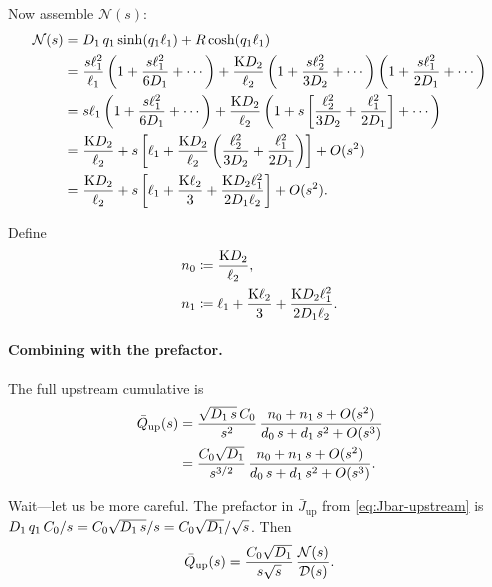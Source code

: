 Now assemble $\mathcal{N}(s)$:
\begin{align}
  \mathcal{N}(s)
  &= D_{1}\,q_1\sinh(q_1\ell_{1}) + R\cosh(q_1\ell_{1})
  \notag\\
  &= \frac{s\ell_{1}^2}{\ell_{1}}
  \left(1 + \frac{s\ell_{1}^2}{6D_{1}} + \cdots\right)
  + \frac{\mathrm{K}D_{2}}{\ell_{2}}
  \left(1 + \frac{s\ell_{2}^2}{3D_{2}} + \cdots\right)
  \left(1 + \frac{s\ell_{1}^2}{2D_{1}} + \cdots\right)
  \notag\\
  &= s\ell_{1}\left(1 + \frac{s\ell_{1}^2}{6D_{1}} + \cdots\right)
  + \frac{\mathrm{K}D_{2}}{\ell_{2}}
  \left(1 + s\left[\frac{\ell_{2}^2}{3D_{2}}
    + \frac{\ell_{1}^2}{2D_{1}}\right] + \cdots\right)
  \notag\\
  &= \frac{\mathrm{K}D_{2}}{\ell_{2}}
  + s\left[\ell_{1} + \frac{\mathrm{K}D_{2}}{\ell_{2}}
    \left(\frac{\ell_{2}^2}{3D_{2}} + \frac{\ell_{1}^2}{2D_{1}}\right)
  \right] + O(s^2)
  \notag\\
  &= \frac{\mathrm{K}D_{2}}{\ell_{2}}
  + s\left[\ell_{1} + \frac{\mathrm{K}\ell_{2}}{3}
    + \frac{\mathrm{K}D_{2}\ell_{1}^2}{2D_{1}\ell_{2}}\right] + O(s^2).
  \label{eq:N-expanded}
\end{align}

Define
\begin{align}
  n_0 &\coloneqq \frac{\mathrm{K}D_{2}}{\ell_{2}},\\
  n_1 &\coloneqq \ell_{1} + \frac{\mathrm{K}\ell_{2}}{3}
    + \frac{\mathrm{K}D_{2}\ell_{1}^2}{2D_{1}\ell_{2}}.
\end{align}

\paragraph{Combining with the prefactor.}
The full upstream cumulative is
\begin{align}
  \bar{Q}_{\mathrm{up}}(s)
  &= \frac{\sqrt{D_{1}\,s}\,C_0}{s^2}\,
  \frac{n_0 + n_1\,s + O(s^2)}{d_0\,s + d_1\,s^2 + O(s^3)}
  \notag\\
  &= \frac{C_0\sqrt{D_{1}}}{s^{3/2}}\,
  \frac{n_0 + n_1\,s + O(s^2)}{d_0\,s + d_1\,s^2 + O(s^3)}.
\end{align}

Wait---let us be more careful.  The prefactor in $\bar{J}_{\mathrm{up}}$ from
\cref{eq:Jbar-upstream} is $D_{1}\,q_1\,C_0/s = C_0\sqrt{D_{1}\,s}/s
= C_0\sqrt{D_{1}}/\sqrt{s}$.  Then
\begin{equation}
  \bar{Q}_{\mathrm{up}}(s) = \frac{C_0\sqrt{D_{1}}}{s\sqrt{s}}\,
  \frac{\mathcal{N}(s)}{\mathcal{D}(s)}.
\end{equation}

